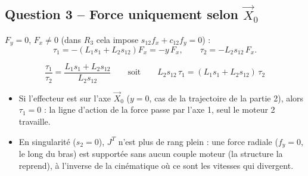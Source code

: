 \documentclass[11pt,a4paper]{article}
\begin{document}
\subsection*{Question 3 -- Force uniquement selon $\vec X_0$}
$F_y=0$, $F_x\ne0$ (dans $R_3$ cela impose $s_{12}f_x+c_{12}f_y=0$) :
\[\tau_1=-(L_1s_1+L_2s_{12})F_x=-y\,F_x,\qquad \tau_2=-L_2s_{12}\,F_x.\]
\begin{res}
\[\frac{\tau_1}{\tau_2}=\frac{L_1s_1+L_2s_{12}}{L_2s_{12}}\qquad\text{soit}\qquad L_2s_{12}\,\tau_1=(L_1s_1+L_2s_{12})\,\tau_2\]
\end{res}
\begin{rem}
\begin{itemize}[nosep]
\item Si l'effecteur est sur l'axe $\vec X_0$ ($y=0$, cas de la trajectoire de la partie 2), alors $\tau_1=0$ : la ligne d'action de la force passe par l'axe 1, seul le moteur 2 travaille.
\item En singularité ($s_2=0$), $J^T$ n'est plus de rang plein : une force radiale ($f_y=0$, le long du bras) est supportée sans aucun couple moteur (la structure la reprend), à l'inverse de la cinématique où ce sont les vitesses qui divergent.
\end{itemize}
\end{rem}
\end{document}
